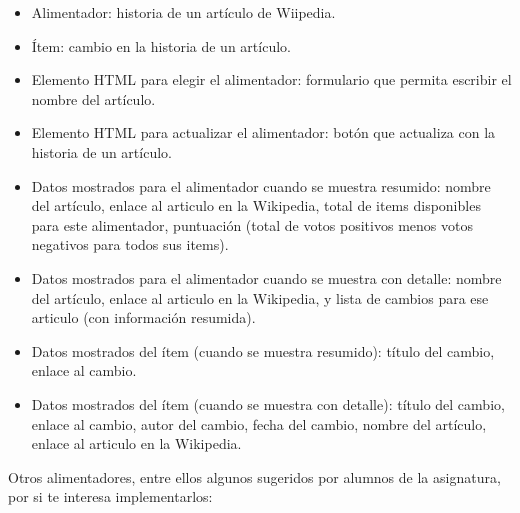 \begin{itemize}
  \begin{itemize}
  \item Alimentador: historia de un artículo de Wiipedia.
  \item Ítem: cambio en la historia de un artículo.
  \item Elemento HTML para elegir el alimentador: formulario que permita escribir el nombre del artículo.
  \item Elemento HTML para actualizar el alimentador: botón que actualiza con la historia de un artículo.
  \item Datos mostrados para el alimentador cuando se muestra resumido: nombre del artículo, enlace al articulo en la Wikipedia, total de items disponibles para este alimentador, puntuación (total de votos positivos menos votos negativos para todos sus items).
  \item Datos mostrados para el alimentador cuando se muestra con detalle: nombre del artículo, enlace al articulo en la Wikipedia, y lista de cambios para ese articulo (con información resumida).
  \item Datos mostrados del ítem (cuando se muestra resumido): título del cambio, enlace al cambio.
  \item Datos mostrados del ítem (cuando se muestra con detalle): título del cambio, enlace al cambio, autor del cambio, fecha del cambio, nombre del artículo, enlace al articulo en la Wikipedia.
  \end{itemize}

\end{itemize}

Otros alimentadores, entre ellos algunos sugeridos por alumnos de la asignatura, por si te interesa implementarlos:

